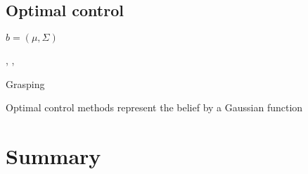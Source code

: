 \subsection{Optimal control}
$b = (\mu,\Sigma)$
 
\cite{plattRSS10} 	%
\cite{Erez10ascalable},
\cite{van_den_Berg_2012}, 
\cite{Platt-RSS-10}

 
Grasping
\cite{u_aware_grasp_ICRA_2015}
\cite{learn_grasp_un_icra_2011}
\cite{seq_traj_replan_iros_2013}
\cite{Li_2015}


\cite{un_water_inspection_icra_2012}


Optimal control methods represent the belief by a Gaussian function 

\cite{Bayesian_explor_exploit_2009}
\cite{Macro_uncertainty_2011}

\section{Summary}




